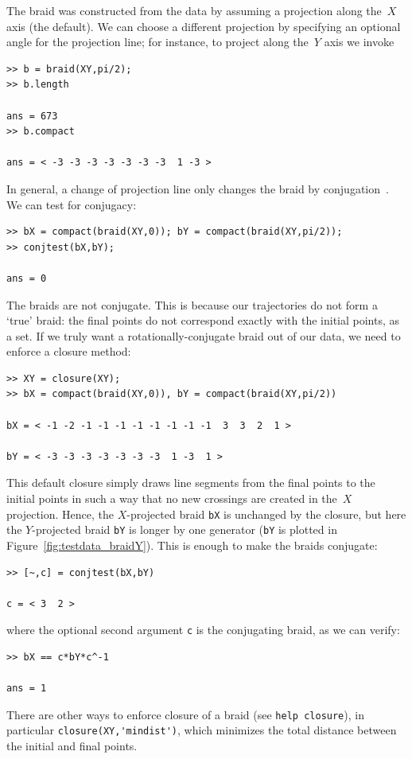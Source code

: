 \documentclass[12pt]{article}
\begin{document}
The braid was constructed from the data by assuming a projection along
the~$X$ axis (the default).  We can choose a different projection by
specifying an optional angle for the projection line; for instance, to
project along the~$Y$ axis we invoke
\begin{lstlisting}[frame=single,framerule=0pt]
>> b = braid(XY,pi/2);
>> b.length

ans = 673
>> b.compact

ans = < -3 -3 -3 -3 -3 -3 -3  1 -3 >
\end{lstlisting}
In general, a change of projection line only changes the braid by
conjugation~\citep{Boyland1994,Thiffeault2010}.  We can test for
conjugacy:
\begin{lstlisting}[frame=single,framerule=0pt]
>> bX = compact(braid(XY,0)); bY = compact(braid(XY,pi/2));
>> conjtest(bX,bY);

ans = 0
\end{lstlisting}
The braids are not conjugate.  This is because our trajectories do not
form a `true' braid: the final points do not correspond exactly with
the initial points, as a set.  If we truly want a
rotationally-conjugate braid out of our data, we need to enforce a
closure method:
\begin{lstlisting}[frame=single,framerule=0pt]
>> XY = closure(XY);
>> bX = compact(braid(XY,0)), bY = compact(braid(XY,pi/2))

bX = < -1 -2 -1 -1 -1 -1 -1 -1 -1 -1  3  3  2  1 >

bY = < -3 -3 -3 -3 -3 -3 -3  1 -3  1 >
\end{lstlisting}
This default closure simply draws line segments from the final points
to the initial points in such a way that no new crossings are created
in the~$X$ projection.  Hence, the $X$-projected braid \lstinline{bX}
is unchanged by the closure, but here the $Y$-projected braid
\lstinline{bY} is longer by one generator (\lstinline{bY} is plotted
in Figure~\ref{fig:testdata_braidY}).  This is enough to make the
braids conjugate:
\begin{lstlisting}[frame=single,framerule=0pt]
>> [~,c] = conjtest(bX,bY)

c = < 3  2 >
\end{lstlisting}
where the optional second argument \lstinline{c} is the conjugating
braid, as we can verify:
\begin{lstlisting}[frame=single,framerule=0pt]
>> bX == c*bY*c^-1

ans = 1
\end{lstlisting}
There are other ways to enforce closure of a braid (see
\lstinline{help closure}), in particular
\lstinline{closure(XY,'mindist')}, which minimizes the total distance
between the initial and final points.
\end{document}
